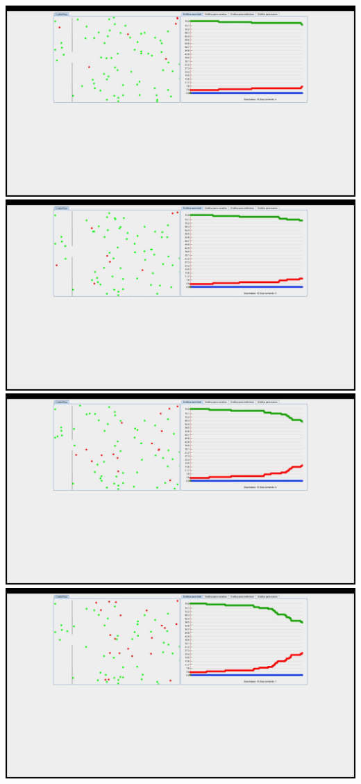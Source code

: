 \documentclass{report}
\begin{document}
\includegraphics[scale=0.20]{4}
\includegraphics[scale=0.20]{5}
\includegraphics[scale=0.20]{6}
\includegraphics[scale=0.20]{7}
\end{document}
